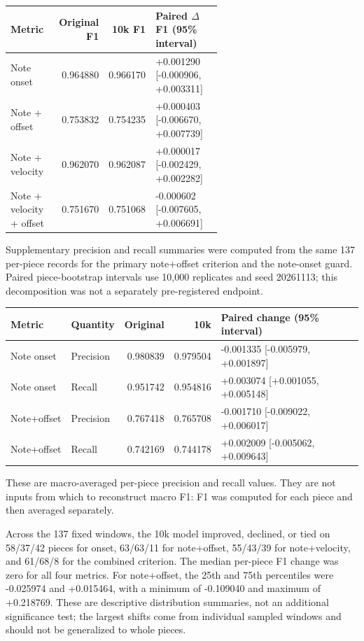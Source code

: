 \documentclass[11pt]{article}
\begin{document}
\begin{center}
\begin{tabular}{p{0.25\linewidth}rrp{0.35\linewidth}}
\toprule
\textbf{Metric} & \textbf{Original F1} & \textbf{10k F1} &
\textbf{Paired $\Delta$ F1 (95\% interval)} \\
\midrule
Note onset & 0.964880 & 0.966170 & +0.001290 [-0.000906, +0.003311] \\
Note + offset & 0.753832 & 0.754235 & +0.000403 [-0.006670, +0.007739] \\
Note + velocity & 0.962070 & 0.962087 & +0.000017 [-0.002429, +0.002282] \\
Note + velocity + offset & 0.751670 & 0.751068 & -0.000602 [-0.007605, +0.006691] \\
\bottomrule
\end{tabular}
\end{center}

Supplementary precision and recall summaries were computed from the same
137 per-piece records for the primary note+offset criterion and the
note-onset guard. Paired piece-bootstrap intervals use 10,000 replicates
and seed 20261113; this decomposition was not a separately pre-registered
endpoint.

\begin{center}
\begin{tabular}{llrrl}
\toprule
\textbf{Metric} & \textbf{Quantity} & \textbf{Original} & \textbf{10k} &
\textbf{Paired change (95\% interval)}\\
\midrule
Note onset & Precision & 0.980839 & 0.979504 & -0.001335 [-0.005979, +0.001897]\\
Note onset & Recall & 0.951742 & 0.954816 & +0.003074 [+0.001055, +0.005148]\\
Note+offset & Precision & 0.767418 & 0.765708 & -0.001710 [-0.009022, +0.006017]\\
Note+offset & Recall & 0.742169 & 0.744178 & +0.002009 [-0.005062, +0.009643]\\
\bottomrule
\end{tabular}
\end{center}

These are macro-averaged per-piece precision and recall values. They are
not inputs from which to reconstruct macro F1: F1 was computed for each
piece and then averaged separately.

Across the 137 fixed windows, the 10k model improved, declined, or tied on
58/37/42 pieces for onset, 63/63/11 for note+offset, 55/43/39 for
note+velocity, and 61/68/8 for the combined criterion. The median per-piece
F1 change was zero for all four metrics. For note+offset, the 25th and
75th percentiles were -0.025974 and +0.015464, with a minimum of -0.109040
and maximum of +0.218769. These are descriptive distribution summaries,
not an additional significance test; the largest shifts come from
individual sampled windows and should not be generalized to whole pieces.
\end{document}
